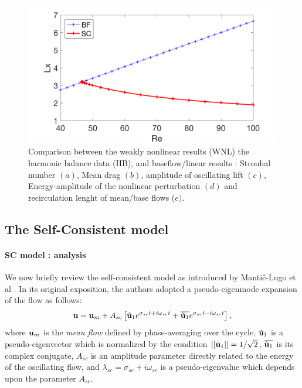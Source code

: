 \documentclass[twocolumn,10pt]{asme2ej}
\newcommand{\be}[1]{ \begin{equation} \label{#1}}
\newcommand{\ee}{\end{equation}}
\begin{document}
\begin{figure}
\begin{center}
\includegraphics[width=.9 \linewidth]{Cylinder_Lx_Re_HB.png}
\end{center}
\caption{Comparison between the weakly nonlinear results (WNL) the harmonic balance data (HB), and baseflow/linear results : Strouhal number $(a)$, Mean drag $(b)$, amplitude of oscillating lift $(c)$, Energy-amplitude of the nonlinear perturbation $(d)$ and recirculation lenght of mean/base flows ($e)$. 
}
\label{fig:HB_SC_DATA_COMP}
\end{figure}



\subsection{The Self-Consistent model  }
\paragraph{SC model : analysis }



We now briefly review the self-consistent model as introduced by Manti\v{c}-Lugo et 
al \cite{MLugo2014}. In its original exposition, the authors adopted a pseudo-eigenmode expansion of the flow 
as follows: 
\be{SC}
{\bf u } = {\bf u }_m + A_{sc} \left[ \tilde{{\bf u }}_1 e^{\sigma_{sc} t + i \omega_{sc} t} +   \overline{\tilde{\bf u }_1} e^{\sigma_{sc} t  -i \omega_{sc} t} \right],
\ee  
where ${\bf u }_m$ is the {\em mean flow} defined by phase-averaging over the cycle, $\tilde{{\bf u }}_1$ is a pseudo-eigenvector which is normalized by the condition  $||\tilde{{\bf u }}_1|| = 1/\sqrt{2}$, $\overline{\tilde{{\bf u }}_1}$ is its complex conjugate,
$A_{sc}$ is an amplitude parameter directly related to the energy of the oscillating flow, and $\lambda_{sc} = \sigma_{sc} + i \omega_{sc}$ is a pseudo-eigenvalue which depends upon the parameter $A_{sc}$. 
\end{document}
